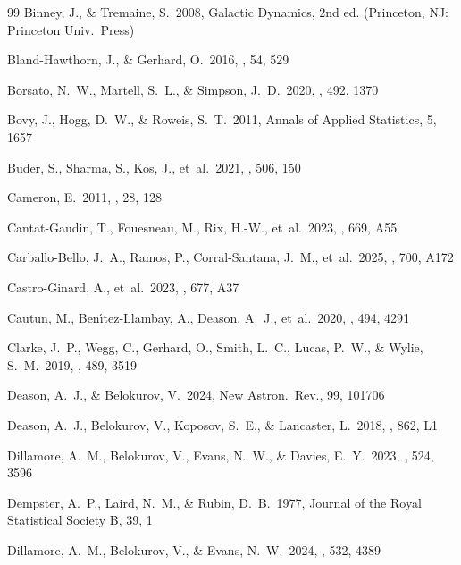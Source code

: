 \documentclass{aa}  %
\begin{document}
\begin{thebibliography}{99}
Binney, J., \& Tremaine, S.\ 2008, Galactic Dynamics, 2nd ed.
(Princeton, NJ: Princeton Univ.\ Press)

Bland-Hawthorn, J., \& Gerhard, O.\ 2016, \araa, 54, 529

Borsato, N.~W., Martell, S.~L., \& Simpson, J.~D.\ 2020, \mnras,
492, 1370

Bovy, J., Hogg, D.~W., \& Roweis, S.~T.\ 2011, Annals of Applied
Statistics, 5, 1657

Buder, S., Sharma, S., Kos, J., et~al.\ 2021, \mnras, 506, 150

Cameron, E.\ 2011, \pasa, 28, 128

Cantat-Gaudin, T., Fouesneau, M., Rix, H.-W., et~al.\ 2023, \aap,
669, A55

Carballo-Bello, J.~A., Ramos, P., Corral-Santana, J.~M., et~al.\
2025, \aap, 700, A172

Castro-Ginard, A., et~al.\ 2023, \aap, 677, A37

Cautun, M., Ben\'{\i}tez-Llambay, A., Deason, A.~J., et~al.\ 2020,
\mnras, 494, 4291

Clarke, J.~P., Wegg, C., Gerhard, O., Smith, L.~C., Lucas, P.~W., \&
Wylie, S.~M.\ 2019, \mnras, 489, 3519

Deason, A.~J., \& Belokurov, V.\ 2024, New Astron.\ Rev., 99, 101706

Deason, A.~J., Belokurov, V., Koposov, S.~E., \& Lancaster, L.\
2018, \apjl, 862, L1

Dillamore, A.~M., Belokurov, V., Evans, N.~W., \& Davies, E.~Y.\
2023, \mnras, 524, 3596

\bibitem[Dempster et~al.(1977)]{Dempster1977}
Dempster, A.~P., Laird, N.~M., \& Rubin, D.~B.\ 1977, Journal of the
Royal Statistical Society B, 39, 1

\bibitem[Dillamore et~al.(2024)]{Dillamore2024}
Dillamore, A.~M., Belokurov, V., \& Evans, N.~W.\ 2024, \mnras,
532, 4389


\end{thebibliography}
\end{document}
